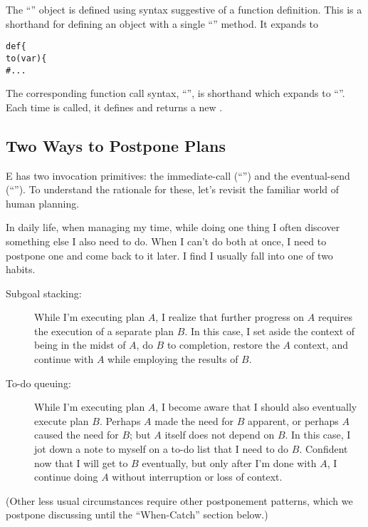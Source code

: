 \documentclass{llncs}
\begin{document}
The ``'' object is defined using syntax
suggestive of a function definition. This is a shorthand for defining
an object with a single ``'' method. It expands to
%
\begin{alltt}
    def  \{
        to (var ) \{
            # ...
\end{alltt}
%
The corresponding function call syntax,
``'', is shorthand which expands to
``''. Each time  is
called, it defines and returns a new .

\subsection{Two Ways to Postpone Plans}

E has two invocation primitives: the immediate-call (``'') and
the eventual-send (``\code{<-}''). To understand the rationale for
these, let's revisit the familiar world of human planning.

In daily life, when managing my time, while doing one thing I often
discover something else I also need to do. When I can't do both at
once, I need to postpone one and come back to it later. I find I
usually fall into one of two habits.

\begin{description}
\item[Subgoal stacking:] While I'm executing plan $A$, I realize that
further progress on $A$ requires the execution of a separate plan
$B$. In this case, I set aside the context of being in the midst of
$A$, do $B$ to completion, restore the $A$ context, and continue with
$A$ while employing the results of $B$.

\item[To-do queuing:] While I'm executing plan $A$, I become aware
that I should also eventually execute plan $B$. Perhaps $A$ made the
need for $B$ apparent, or perhaps $A$ caused the need for $B$; but $A$
itself does not depend on $B$. In this case, I jot down a note to
myself on a to-do list that I need to do $B$. Confident now that I
will get to $B$ eventually, but only after I'm done with $A$, I
continue doing $A$ without interruption or loss of context.
\end{description}

(Other less usual circumstances require other postponement patterns,
which we postpone discussing until the ``When-Catch'' section below.)
\end{document}
